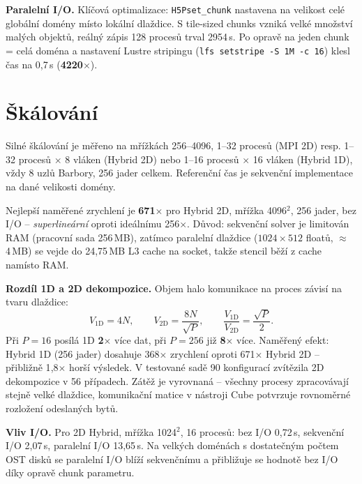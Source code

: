 \documentclass{article}
\begin{document}
\textbf{Paralelní I/O.}
Klíčová optimalizace: \texttt{H5Pset\_chunk} nastavena na velikost celé
globální domény místo lokální dlaždice.
S tile-sized chunks vzniká velké množství malých objektů, reálný zápis
128 procesů trval 2954\,s.
Po opravě na jeden chunk = celá doména a nastavení Lustre stripingu
(\texttt{lfs setstripe -S 1M -c 16}) klesl čas na 0{,}7\,s (\textbf{4220$\times$}).

\section{Škálování}
\label{sec:skalovani}

Silné škálování je měřeno na mřížkách 256–4096, 1–32 procesů (MPI 2D)
resp. 1–32 procesů $\times$ 8 vláken (Hybrid 2D) nebo 1–16 procesů
$\times$ 16 vláken (Hybrid 1D), vždy 8 uzlů Barbory, 256 jader celkem.
Referenční čas je sekvenční implementace na dané velikosti domény.

Nejlepší naměřené zrychlení je \textbf{671$\times$} pro Hybrid 2D, mřížka
4096$^2$, 256 jader, bez I/O – \emph{superlineární} oproti ideálnímu 256$\times$.
Důvod: sekvenční solver je limitován RAM (pracovní sada 256\,MB),
zatímco paralelní dlaždice ($1024 \times 512$ floatů, $\approx$\,4\,MB) se vejde
do 24{,}75\,MB L3 cache na socket, takže stencil běží z cache namísto RAM.

\medskip
\textbf{Rozdíl 1D a 2D dekompozice.}
Objem halo komunikace na proces závisí na tvaru dlaždice:
\[
  V_\text{1D} = 4N, \qquad
  V_\text{2D} = \frac{8N}{\sqrt{P}}, \qquad
  \frac{V_\text{1D}}{V_\text{2D}} = \frac{\sqrt{P}}{2}.
\]
Při $P=16$ posílá 1D \textbf{2$\times$} více dat, při $P=256$
již \textbf{8$\times$} více.
Naměřený efekt: Hybrid 1D (256 jader) dosahuje 368$\times$ zrychlení
oproti 671$\times$ Hybrid 2D – přibližně 1{,}8$\times$ horší výsledek.
V testované sadě 90 konfigurací zvítězila 2D dekompozice v 56 případech.
Zátěž je vyrovnaná – všechny procesy zpracovávají stejně velké dlaždice,
komunikační matice v nástroji Cube potvrzuje rovnoměrné rozložení odeslaných bytů.

\medskip
\textbf{Vliv I/O.}
Pro 2D Hybrid, mřížka 1024$^2$, 16 procesů:
bez I/O 0{,}72\,s, sekvenční I/O 2{,}07\,s, paralelní I/O 13{,}65\,s.
Na velkých doménách s dostatečným počtem OST disků se paralelní I/O blíží
sekvenčnímu a přibližuje se hodnotě bez I/O díky opravě chunk parametru.
\end{document}
